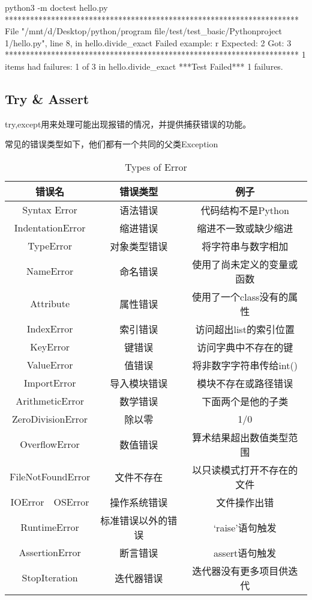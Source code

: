 \documentclass{article}
\begin{document}
      \begin{codeblock}[language=bash, caption={doctest bash}]
        python3 -m doctest hello.py
        **********************************************************************
        File "/mnt/d/Desktop/python/program file/test/test_basic/Pythonproject
        1/hello.py", line 8, in hello.divide_exact
        Failed example:
            r
        Expected:
            2
        Got:
            3
        **********************************************************************
        1 items had failures:
          1 of   3 in hello.divide_exact
        ***Test Failed*** 1 failures.
      \end{codeblock}

    \subsection{Try \& Assert}
      try,except用来处理可能出现报错的情况，并提供捕获错误的功能。

      常见的错误类型如下，他们都有一个共同的父类Exception
      \begin{table}
        \centering  
        \caption{Types of Error}
        \label{tab: types of error}
        \begin{tabular}{ccc}
          \toprule[1.5pt]
          错误名 & 错误类型 & 例子 \\
          \midrule
          Syntax Error & 语法错误 & 代码结构不是Python \\
          IndentationError & 缩进错误 & 缩进不一致或缺少缩进 \\
          TypeError & 对象类型错误 & 将字符串与数字相加 \\
          NameError & 命名错误 & 使用了尚未定义的变量或函数 \\
          Attribute & 属性错误 & 使用了一个class没有的属性 \\
          IndexError & 索引错误 & 访问超出list的索引位置 \\
          KeyError & 键错误 & 访问字典中不存在的键 \\
          ValueError & 值错误 & 将非数字字符串传给int() \\
          ImportError & 导入模块错误 & 模块不存在或路径错误 \\
          ArithmeticError & 数学错误 & 下面两个是他的子类 \\
          ZeroDivisionError & 除以零 & 1/0 \\
          OverflowError & 数值错误 & 算术结果超出数值类型范围 \\
          FileNotFoundError & 文件不存在 & 以只读模式打开不存在的文件 \\
          IOError~~OSError & 操作系统错误 & 文件操作出错 \\
          RuntimeError & 标准错误以外的错误 & `raise'语句触发 \\
          AssertionError & 断言错误 & assert语句触发 \\
          StopIteration & 迭代器错误 & 迭代器没有更多项目供迭代 \\
          \bottomrule[1.5pt]
        \end{tabular}
      \end{table}
\end{document}
